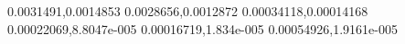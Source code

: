0.0031491,0.0014853
0.0028656,0.0012872
0.00034118,0.00014168
0.00022069,8.8047e-005
0.00016719,1.834e-005
0.00054926,1.9161e-005